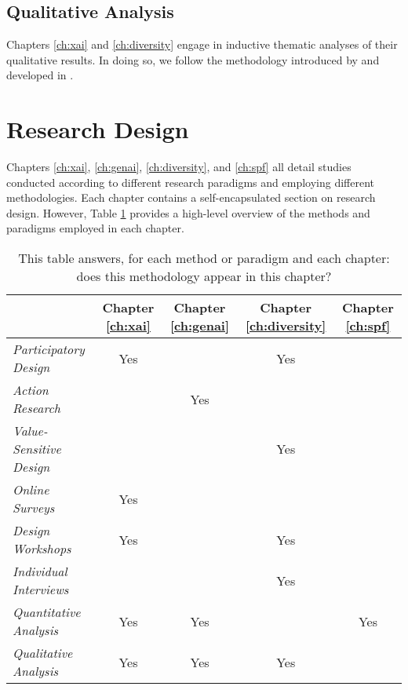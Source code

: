\subsection{Qualitative Analysis}
Chapters \ref{ch:xai} and \ref{ch:diversity} engage in inductive thematic analyses of their qualitative results. In doing so, we follow the methodology introduced by \textcite{braun_using_2006} and developed in \textcite{braun_conceptual_2022,braun_toward_2023,noauthor_thematic_nodate}.

\section{Research Design}
Chapters \ref{ch:xai}, \ref{ch:genai}, \ref{ch:diversity}, and \ref{ch:spf} all detail studies conducted according to different research paradigms and employing different methodologies. Each chapter contains a self-encapsulated section on research design. However, Table \ref{tab:method_subsections} provides a high-level overview of the methods and paradigms employed in each chapter.

\begin{table}[htbp]
    \centering
    \begin{tabular}{|l|c|c|c|c|}
    \hline
    & \textbf{Chapter \ref{ch:xai}} & \textbf{Chapter \ref{ch:genai}} & \textbf{Chapter \ref{ch:diversity}} & \textbf{Chapter \ref{ch:spf}} \\
    \hline
    \textit{Participatory Design} & Yes & & Yes & \\ 
    \textit{Action Research} & & Yes & & \\ 
    \textit{Value-Sensitive Design} & & & Yes & \\ 
    \hline
    \textit{Online Surveys} & Yes & & & \\ 
    \textit{Design Workshops} & Yes & & Yes & \\ 
    \textit{Individual Interviews} & & & Yes & \\ 
    \textit{Quantitative Analysis} & Yes & Yes & & Yes \\ 
    \textit{Qualitative Analysis} & Yes & Yes & Yes & \\
    \hline
    \end{tabular}
    \caption{This table answers, for each method or paradigm and each chapter: does this methodology appear in this chapter?}
    \label{tab:method_subsections}
\end{table}
